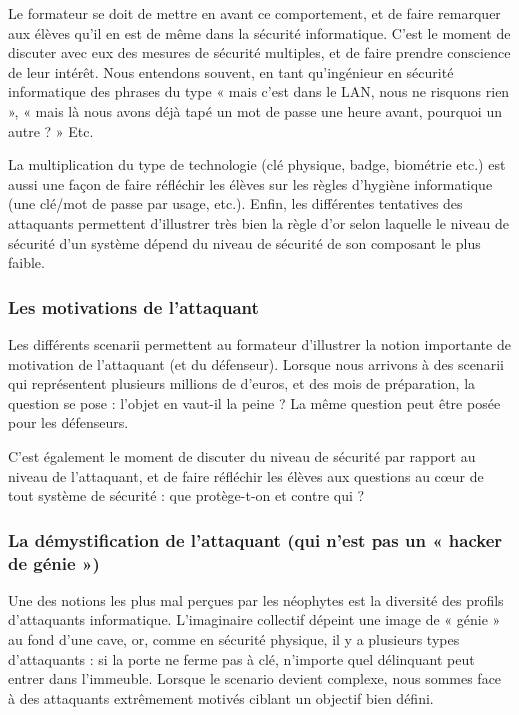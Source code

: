 \documentclass[11pt]{article} %
\begin{document}
Le formateur se doit de mettre en avant ce comportement, et de faire remarquer
aux élèves qu'il en est de même dans la sécurité informatique. C'est le moment
de discuter avec eux des mesures de sécurité multiples, et de faire prendre
conscience de leur intérêt. Nous entendons souvent, en tant qu'ingénieur en
sécurité informatique des phrases du type « mais c'est dans le LAN, nous ne
risquons rien », « mais là nous avons déjà tapé un mot de passe une heure avant,
pourquoi un autre ? » Etc.

La multiplication du type de technologie (clé physique, badge, biométrie etc.)
est aussi une façon de faire réfléchir les élèves sur les règles d'hygiène
informatique (une clé/mot de passe par usage, etc.).
Enfin, les différentes tentatives des attaquants permettent d'illustrer très
bien la règle d'or selon laquelle le niveau de sécurité d'un système dépend du
niveau de sécurité de son composant le plus faible.

\subsubsection{Les motivations de l'attaquant}
Les différents scenarii permettent au formateur d'illustrer la notion importante
de motivation de l'attaquant (et du défenseur). Lorsque nous arrivons à des
scenarii qui représentent plusieurs millions de d'euros, et des mois de
préparation, la question se pose : l'objet en vaut-il la peine ? La même
question peut être posée pour les défenseurs.

C'est également le moment de discuter du niveau de sécurité par rapport au
niveau de l'attaquant, et de faire réfléchir les élèves aux questions au cœur de
tout système de sécurité : que protège-t-on et contre qui ?

\subsubsection{La démystification de l'attaquant (qui n'est pas un « hacker de
génie »)}
Une des notions les plus mal perçues par les néophytes est la diversité des
profils d'attaquants informatique. L'imaginaire collectif dépeint une image de «
génie » au fond d'une cave, or, comme en sécurité physique, il y a plusieurs
types d'attaquants : si la porte ne ferme pas à clé, n'importe quel délinquant
peut entrer dans l'immeuble. Lorsque le scenario devient complexe, nous sommes
face à des attaquants extrêmement motivés ciblant un objectif bien défini.
\end{document}
